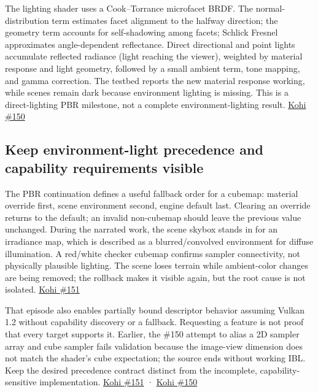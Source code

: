 The lighting shader uses a Cook--Torrance microfacet BRDF. The normal-distribution term estimates facet alignment to the halfway direction; the geometry term accounts for self-shadowing among facets; Schlick Fresnel approximates angle-dependent reflectance. Direct directional and point lights accumulate reflected radiance (light reaching the viewer), weighted by material response and light geometry, followed by a small ambient term, tone mapping, and gamma correction. The testbed reports the new material response working, while scenes remain dark because environment lighting is missing. This is a direct-lighting PBR milestone, not a complete environment-lighting result. \href{https://www.youtube.com/watch?v=SNdjjeRAFc4}{Kohi \#150}

\subsection{Keep environment-light precedence and capability requirements visible}\label{06-engine-ii-ch025-keep-environment-light-precedence-and-capability-requirements-visible}

\hypertarget{06-engine-ii-ch025-keep-environment-light-precedence-and-capability-requirements-visible}{}

The PBR continuation defines a useful fallback order for a cubemap: material override first, scene environment second, engine default last. Clearing an override returns to the default; an invalid non-cubemap should leave the previous value unchanged. During the narrated work, the scene skybox stands in for an irradiance map, which is described as a blurred/convolved environment for diffuse illumination. A red/white checker cubemap confirms sampler connectivity, not physically plausible lighting. The scene loses terrain while ambient-color changes are being removed; the rollback makes it visible again, but the root cause is not isolated. \href{https://www.youtube.com/watch?v=OME4d4Zwd7k}{Kohi \#151}

That episode also enables partially bound descriptor behavior assuming Vulkan 1.2 without capability discovery or a fallback. Requesting a feature is not proof that every target supports it. Earlier, the \#150 attempt to alias a 2D sampler array and cube sampler fails validation because the image-view dimension does not match the shader's cube expectation; the source ends without working IBL. Keep the desired precedence contract distinct from the incomplete, capability-sensitive implementation. \href{https://www.youtube.com/watch?v=OME4d4Zwd7k}{Kohi \#151} · \href{https://www.youtube.com/watch?v=SNdjjeRAFc4}{Kohi \#150}

